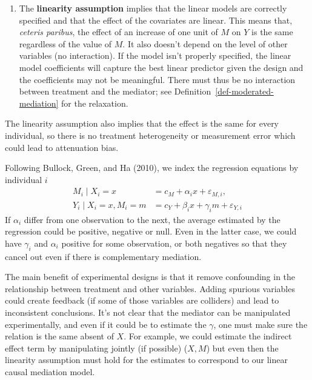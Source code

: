 \documentclass[
  11pt,
  letterpaper,
]{scrbook}
\providecommand{\tightlist}{%
  \setlength{\itemsep}{0pt}\setlength{\parskip}{0pt}}\usepackage{longtable,booktabs,array}
\theoremstyle{definition}
\theoremstyle{definition}
\theoremstyle{remark}
\begin{document}
\begin{enumerate}
\def\labelenumi{\arabic{enumi}.}
\setcounter{enumi}{1}
\tightlist
\item
  The \textbf{linearity assumption} implies that the linear models are
  correctly specified and that the effect of the covariates are linear.
  This means that, \emph{ceteris paribus}, the effect of an increase of
  one unit of \(M\) on \(Y\) is the same regardless of the value of
  \(M\). It also doesn't depend on the level of other variables (no
  interaction). If the model isn't properly specified, the linear model
  coefficients will capture the best linear predictor given the design
  and the coefficients may not be meaningful. There must thus be no
  interaction between treatment and the mediator; see
  Definition~\ref{def-moderated-mediation} for the relaxation.
\end{enumerate}

The linearity assumption also implies that the effect is the same for
every individual, so there is no treatment heterogeneity or measurement
error which could lead to attenuation bias.

Following Bullock, Green, and Ha (2010), we index the regression
equations by individual \(i\) \begin{align*}
M_i\mid X_i=x &= c_M + \alpha_i x + \varepsilon_{M,i},\\
Y_i \mid X_i=x, M_i=m &=  c_Y + \beta_i x + \gamma_i m + \varepsilon_{Y,i}
\end{align*} If \(\alpha_i\) differ from one observation to the next,
the average estimated by the regression could be positive, negative or
null. Even in the latter case, we could have \(\gamma_i\) and
\(\alpha_i\) positive for some observation, or both negatives so that
they cancel out even if there is complementary mediation.

The main benefit of experimental designs is that it remove confounding
in the relationship between treatment and other variables. Adding
spurious variables could create feedback (if some of those variables are
colliders) and lead to inconsistent conclusions. It's not clear that the
mediator can be manipulated experimentally, and even if it could be to
estimate the \(\gamma\), one must make sure the relation is the same
absent of \(X\). For example, we could estimate the indirect effect term
by manipulating jointly (if possible) (\(X, M\)) but even then the
linearity assumption must hold for the estimates to correspond to our
linear causal mediation model.
\end{document}
